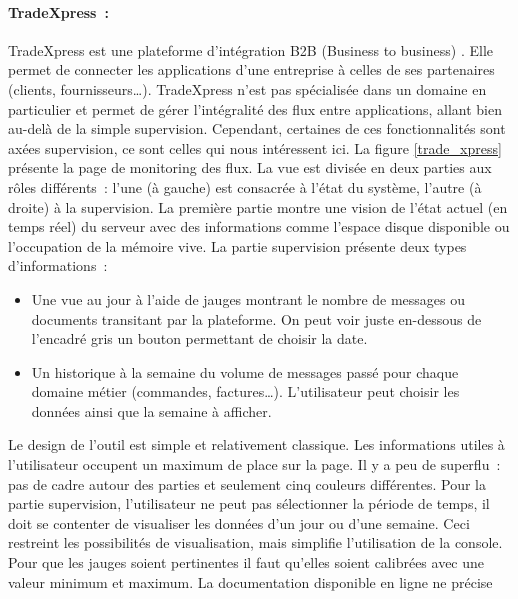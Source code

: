 			\paragraph{TradeXpress~:}
			TradeXpress est une plateforme d’intégration B2B (Business to business)
			\citep{gmi_connectivity_gateway_2014}.
			Elle permet de connecter les applications d’une entreprise à celles de ses
			partenaires (clients, fournisseurs…). TradeXpress n’est pas spécialisée dans
			un domaine en particulier et permet de gérer l’intégralité des flux entre
			applications, allant bien au-delà de la simple supervision. Cependant, certaines
			de ces fonctionnalités sont axées supervision, ce sont celles qui nous
			intéressent ici. La figure \ref{trade_xpress} présente la page de monitoring des
			flux.\newline
			La vue est divisée en deux parties aux rôles
			différents~: l'une (à gauche) est consacrée à l’état du système, l'autre (à
			droite) à la supervision. La première partie montre une vision de l’état
			actuel (en temps réel) du serveur avec des informations comme l'espace
			disque disponible ou l'occupation de la mémoire vive.
			La partie supervision présente deux types d'informations~:
			\begin{itemize}
			  \item Une vue au jour à l’aide de jauges montrant le nombre de messages ou
			  documents transitant par la plateforme. On peut voir juste en-dessous de
			  l’encadré gris un bouton permettant de choisir la date.
			  \item Un historique à la semaine du volume de messages passé pour chaque
			  domaine métier (commandes, factures\ldots). L’utilisateur peut choisir les
			  données ainsi que la semaine à afficher.
			\end{itemize}
			Le design de l’outil est simple et relativement classique. Les informations
			utiles à l’utilisateur occupent un maximum de place sur la page. Il y a peu
			de superflu~: pas de cadre autour des parties et seulement cinq couleurs différentes.\newline
			Pour la partie supervision, l’utilisateur ne peut pas sélectionner la
			période de temps, il doit se contenter de visualiser les données d’un jour
			ou d’une semaine. Ceci restreint les possibilités de
			visualisation, mais simplifie l’utilisation de la console.\newline
			Pour que les jauges soient pertinentes il faut qu’elles soient calibrées avec
			une valeur minimum et maximum. La documentation disponible en ligne ne précise
